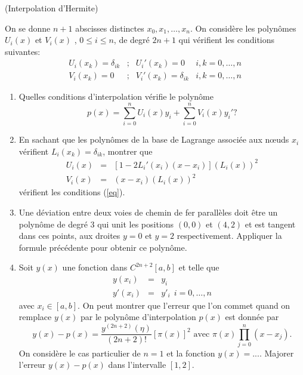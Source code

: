 \documentclass[a4paper,12pt,reqno]{amsart}
\begin{document}
\begin{exo} (Interpolation d'Hermite)

  On se donne $n+1$ abscisses distinctes $x_0, x_1, \ldots , x_n$.
  On considère les polynômes $U_i(x)$ et $V_i(x)$ , $0\leq i\leq n$, de degré $2n+1$ qui vérifient les conditions suivantes:
  \begin{equation}\label{eq}
    \begin{array}{lcll}
      U_i(x_k)=\delta_{ik} & ; & U_i'(x_k)=0           & i,k=0,\ldots,n\\
      V_i(x_k)=0           & ; & V_i'(x_k)=\delta_{ik} & i,k=0,\ldots,n
    \end{array}
  \end{equation}
  \begin{enumerate}
    \item Quelles conditions d'interpolation vérifie le polynôme
      $$
        p(x)=\sum_{i=0}^n U_i(x)y_i +\sum_{i=0}^nV_i(x)y_i' ?
      $$
    \item En sachant que les polynômes de la base de Lagrange associée aux nœuds $x_i$ vérifient $L_i(x_k)=\delta_{ik}$, montrer que
      \begin{eqnarray*}
        U_i(x) &=& \left[ 1-2L_i'(x_i)(x-x_i)\right](L_i(x))^2\\
        V_i(x) &=& (x-x_i)(L_i(x))^2
      \end{eqnarray*}
    vérifient les conditions (\ref{eq}).
    \item Une déviation entre deux voies de chemin de fer parallèles doit être un polynôme de degré 3 qui unit les positions $(0,0)$ et $(4,2)$ et est tangent dans ces points, aux droites $y=0$ et $y=2$ respectivement. Appliquer la formule précédente pour obtenir ce polynôme.
    \item Soit $y(x)$ une fonction dans $C^{2n+2}[a,b]$ et telle que
      \begin{eqnarray*}
        y(x_i)  &=& y_i\\
        y'(x_i) &=& y'_i\ \ i=0,\ldots,n
      \end{eqnarray*}
    avec $x_i\in [a,b]$. On peut montrer que l'erreur que l'on commet quand on remplace $y(x)$ par le polynôme d'interpolation $p(x)$ est donnée par
    $$
      y(x)-p(x)=\frac{y^{(2n+2)}(\eta)}{(2n+2)!}[\pi (x)]^2
        \mbox{ avec } \pi(x)\prod_{j=0}^n (x-x_j).
    $$
    On considère le cas particulier de $n=1$ et la fonction $y(x)=...$. Majorer l'erreur $y(x)-p(x)$ dans l'intervalle $[1,2]$.
  \end{enumerate}
\end{exo}
\end{document}
